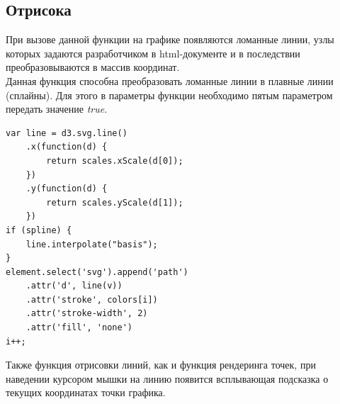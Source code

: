 \documentclass[a4paper,14pt]{extreport}
\begin{document}
\subsection{Отрисока}
\hspace{4ex}При вызове данной функции на графике появляются ломанные линии, узлы которых задаются разработчиком в html-документе и в последствии преобразовываются в массив координат.\\
\hspace{4ex}Данная функция способна преобразовать ломанные линии в плавные линии (сплайны). Для этого в параметры функции необходимо пятым параметром передать значение \textit{true}.
\begin{verbatim}
var line = d3.svg.line()
    .x(function(d) {
        return scales.xScale(d[0]);
    })
    .y(function(d) {
        return scales.yScale(d[1]);
    })
if (spline) {
    line.interpolate("basis");
}
element.select('svg').append('path')
    .attr('d', line(v))
    .attr('stroke', colors[i])
    .attr('stroke-width', 2)
    .attr('fill', 'none')
i++;
\end{verbatim}
\hspace{4ex}Также функция отрисовки линий, как и функция рендеринга точек, при наведении курсором мышки на линию появится всплывающая подсказка о текущих координатах точки графика.
\end{document}
